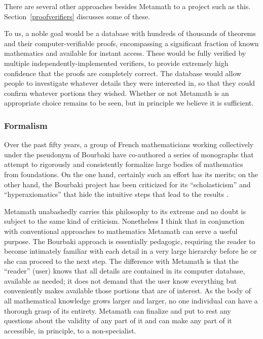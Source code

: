 There are several other approaches besides Metamath to a project such
as this.  Section~\ref{proofverifiers} discusses some of these.

To us, a noble goal would be a database with hundreds of thousands of
theorems and their computer-verifiable proofs, encompassing a significant
fraction of known mathematics and available for instant access.
These would be fully verified by multiple independently-implemented verifiers,
to provide extremely high confidence that the proofs are completely correct.
The database would allow people to investigate whatever details they were
interested in, so that they could confirm whatever portions they wished.
Whether or not Metamath is an appropriate choice remains to be seen, but in
principle we believe it is sufficient.

\subsubsection{Formalism}

Over the past fifty years, a group of French mathematicians working
collectively under the pseudonym of Bourbaki have
co-authored a series of monographs that attempt to rigorously and
consistently formalize large bodies of mathematics from foundations.  On the
one hand, certainly such an effort has its merits; on the other hand, the
Bourbaki project has been criticized for its ``scholasticism'' and
``hyperaxiomatics'' that hide the intuitive steps that lead to the results
\cite[p.~191]{Barrow}.

Metamath unabashedly carries this philosophy to its extreme and no doubt is
subject to the same kind of criticism.  Nonetheless I think that in
conjunction with conventional approaches to mathematics Metamath can serve a
useful purpose.  The Bourbaki approach is essentially pedagogic, requiring the
reader to become intimately familiar with each detail in a very large
hierarchy before he or she can proceed to the next step.  The difference with
Metamath is that the ``reader'' (user) knows that all details are contained in
its computer database, available as needed; it does not demand that the user
know everything but conveniently makes available those portions that are of
interest.  As the body of all mathematical knowledge grows larger and larger,
no one individual can have a thorough grasp of its entirety.  Metamath
can finalize and put to rest any questions about the validity of any part of it
and can make any part of it accessible, in principle, to a non-specialist.

